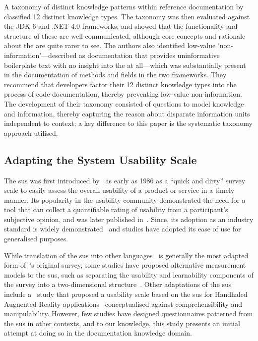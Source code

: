 A taxonomy of distinct knowledge patterns within reference documentation by~\citet{Maalej2013} classified 12 distinct knowledge types. The taxonomy was then evaluated against the JDK 6 and .NET 4.0 frameworks, and showed that the functionality and structure of these  are well-communicated, although core concepts and rationale about the  are quite rarer to see. The authors also identified low-value `non-information'---described as documentation that provides uninformative boilerplate text with no insight into the  at all---which was  substantially present in the documentation of methods and fields in the two frameworks. They recommend that developers factor their 12 distinct knowledge types into the process of code documentation, thereby preventing low-value non-information. The development of their taxonomy consisted of questions to model knowledge and information, thereby capturing the reason about disparate information units independent to context; a key difference to this paper is the systematic taxonomy approach utilised.


\subsection{Adapting the System Usability Scale}

The \gls{sus} was first introduced by~\citeauthor{Brooke:1996ua} as early as 1986 as a ``quick and dirty'' survey scale to easily assess the overall usability of a product or service in a timely manner. Its popularity in the usability community demonstrated the need for a tool that can collect a quantifiable rating of usability from a participant's subjective opinion, and was later published in~\citep{Brooke:1996ua}. Since, its adoption as an industry standard is widely demonstrated~\citep{Brooke:2013vt,Bangor2008} and studies have adopted its ease of use for generalised purposes.

While translation of the \gls{sus} into other languages~\citep{Martins2015,Sauro:2011aj,Borsci2009} is generally the most adapted form of~\citeauthor{Brooke:2013vt}'s original survey, some studies have proposed alternative measurement models to the \gls{sus}, such as separating the usability and learnability components of the survey into a two-dimensional structure~\citep{Borsci2009}. Other adaptations of the \gls{sus} include a~\citeyear{Santos2014} study that proposed a usability scale based on the \gls{sus} for Handhaled Augnented Reality applications~\citep{Santos2014} conceptualised against comprehensibility and manipulability. However, few studies have designed questionnaires patterned from the \gls{sus} in other contexts, and to our knowledge, this study presents an initial attempt at doing so in the  documentation knowledge domain.

